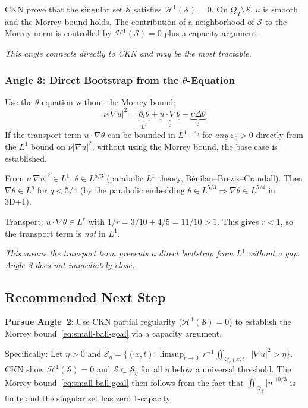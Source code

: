 \documentclass[11pt]{article}
\theoremstyle{definition}
\theoremstyle{remark}
\newcommand{\prt}{\partial_t}
\newcommand{\grad}{\nabla}
\newcommand{\eps}{\varepsilon}
\begin{document}
CKN prove that the singular set $\mathcal{S}$ satisfies $\mathcal{H}^1(\mathcal{S})=0$.
On $Q_T\setminus\mathcal{S}$, $u$ is smooth and the Morrey bound holds.
The contribution of a neighborhood of $\mathcal{S}$ to the Morrey norm is
controlled by $\mathcal{H}^1(\mathcal{S})=0$ plus a capacity argument.

\textit{This angle connects directly to CKN and may be the most tractable.}

\subsubsection{Angle 3: Direct Bootstrap from the $\theta$-Equation}

Use the $\theta$-equation without the Morrey bound:
\[
  \nu|\grad u|^2 = \underbrace{\prt\theta}_{L^1} + \underbrace{u\cdot\grad\theta}_{?} - \underbrace{\nu\Delta\theta}_{?}
\]
If the transport term $u\cdot\grad\theta$ can be bounded in $L^{1+\eps_0}$
for \emph{any} $\eps_0>0$ directly from the $L^1$ bound on $\nu|\grad u|^2$,
without using the Morrey bound, the base case is established.

From $\nu|\grad u|^2\in L^1$: $\theta\in L^{5/3}$ (parabolic $L^1$ theory,
Bénilan--Brezis--Crandall).  Then $\grad\theta\in L^q$ for $q < 5/4$ (by the
parabolic embedding $\theta\in L^{5/3}\Rightarrow\grad\theta\in L^{5/4}$ in 3D+1).

Transport: $u\cdot\grad\theta\in L^r$ with $1/r = 3/10 + 4/5 = 11/10 > 1$.
This gives $r < 1$, so the transport term is \emph{not} in $L^1$.

\textit{This means the transport term prevents a direct bootstrap from $L^1$
without a gap. Angle 3 does not immediately close.}

\subsection{Recommended Next Step}

\textbf{Pursue Angle~2}: Use CKN partial regularity ($\mathcal{H}^1(\mathcal{S})=0$)
to establish the Morrey bound~\eqref{eq:small-ball-goal} via a capacity argument.

Specifically: Let $\eta > 0$ and $\mathcal{S}_\eta = \{(x,t) : \limsup_{r\to 0}\,r^{-1}
\iint_{Q_r(x,t)}|\grad u|^2 > \eta\}$.  CKN show $\mathcal{H}^1(\mathcal{S})=0$
and $\mathcal{S}\subset\mathcal{S}_\eta$ for all $\eta$ below a universal threshold.
The Morrey bound~\eqref{eq:small-ball-goal} then follows from the fact that
$\iint_{Q_T}|u|^{10/3}$ is finite and the singular set has zero 1-capacity.
\end{document}
